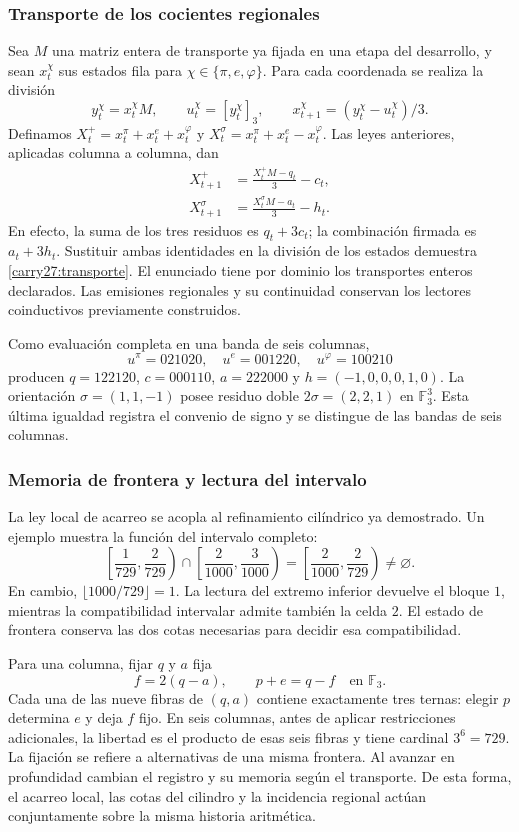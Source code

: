 \subsubsection{Transporte de los cocientes regionales}

Sea \(M\) una matriz entera de transporte ya fijada en una etapa
del desarrollo, y sean \(x_t^\chi\) sus estados fila para
\(\chi\in\{\pi,e,\varphi\}\). Para cada coordenada se realiza
la división
\[
y_t^\chi=x_t^\chi M,\qquad
u_t^\chi=[y_t^\chi]_3,\qquad
x_{t+1}^\chi=(y_t^\chi-u_t^\chi)/3.
\]
Definamos \(X_t^+=x_t^\pi+x_t^e+x_t^\varphi\) y
\(X_t^\sigma=x_t^\pi+x_t^e-x_t^\varphi\).
Las leyes anteriores, aplicadas columna a columna, dan
\begin{equation}
\begin{aligned}
X_{t+1}^+&=\frac{X_t^+M-q_t}{3}-c_t,\\
X_{t+1}^\sigma&=\frac{X_t^\sigma M-a_t}{3}-h_t.
\end{aligned}
\label{carry27:transporte}
\end{equation}
En efecto, la suma de los tres residuos es \(q_t+3c_t\);
la combinación firmada es \(a_t+3h_t\). Sustituir ambas
identidades en la división de los estados demuestra
\eqref{carry27:transporte}. El enunciado tiene por dominio
los transportes enteros declarados. Las emisiones regionales
y su continuidad conservan los lectores coinductivos
previamente construidos.

Como evaluación completa en una banda de seis columnas,
\[
u^\pi=021020,\quad u^e=001220,\quad u^\varphi=100210
\]
producen \(q=122120\), \(c=000110\), \(a=222000\) y
\(h=(-1,0,0,0,1,0)\). La orientación
\(\sigma=(1,1,-1)\) posee residuo doble
\(2\sigma=(2,2,1)\) en \(\mathbb F_3^3\). Esta última
igualdad registra el convenio de signo y se distingue de las
bandas de seis columnas.

\subsubsection{Memoria de frontera y lectura del intervalo}

La ley local de acarreo se acopla al refinamiento cilíndrico
ya demostrado. Un ejemplo muestra la función del intervalo
completo:
\[
\left[\frac1{729},\frac2{729}\right)
\cap
\left[\frac2{1000},\frac3{1000}\right)
=
\left[\frac2{1000},\frac2{729}\right)\ne\varnothing.
\]
En cambio,
\(\lfloor1000/729\rfloor=1\).
La lectura del extremo inferior devuelve el bloque \(1\),
mientras la compatibilidad intervalar admite también la
celda \(2\). El estado de frontera conserva las dos cotas
necesarias para decidir esa compatibilidad.

Para una columna, fijar \(q\) y \(a\) fija
\[
f=2(q-a),\qquad p+e=q-f\quad\text{en }\mathbb F_3.
\]
Cada una de las nueve fibras de \((q,a)\) contiene exactamente
tres ternas: elegir \(p\) determina \(e\) y deja \(f\) fijo.
En seis columnas, antes de aplicar restricciones adicionales,
la libertad es el producto de esas seis fibras y tiene
cardinal \(3^6=729\). La fijación se refiere a alternativas
de una misma frontera. Al avanzar en profundidad cambian
el registro y su memoria según el transporte. De esta
forma, el acarreo local, las cotas del cilindro y la
incidencia regional actúan conjuntamente sobre la misma
historia aritmética.
